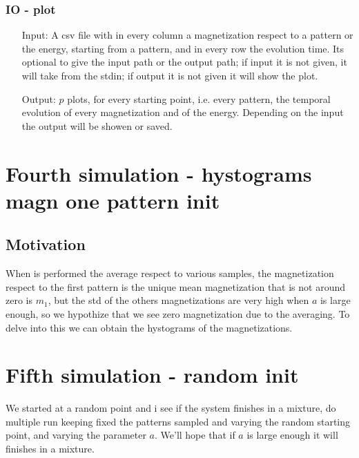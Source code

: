 \documentclass[a4paper,10pt]{article}
\begin{document}
\subsubsection{IO - plot}
\begin{itemize}
 \item[Input:] A csv file with in every column a magnetization respect to a pattern or the energy, starting from a pattern, and in every row the evolution time. Its optional to give the input path or the output path; if input it is not given, it will take from the stdin; if output it is not given it will show the plot.
 \item[Output:] $p$ plots, for every starting point, i.e. every pattern, the temporal evolution of every magnetization and of the energy. Depending on the input the output will be showen or saved.
\end{itemize}

\section{Fourth simulation - hystograms magn one pattern init}

\subsection{Motivation}
When is performed the average respect to various samples, the magnetization respect to the first pattern is the unique mean magnetization that is not around zero is $m_1$, but the std of the others magnetizations are very high when $a$ is large enough, so we hypothize that we see zero magnetization due to the averaging. To delve into this we can obtain the hystograms of the magnetizations.

\section{Fifth simulation - random init}
We started at a random point and i see if the system finishes in a mixture, do multiple run keeping fixed the patterns sampled and varying the random starting point, and varying the parameter $a$. We'll hope that if $a$ is large enough it will finishes in a mixture.


\printbibliography
\end{document}
